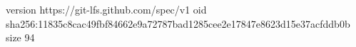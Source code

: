 version https://git-lfs.github.com/spec/v1
oid sha256:11835c8cac49fbf84662e9a72787bad1285cee2e17847e8623d15e37acfddb0b
size 94
